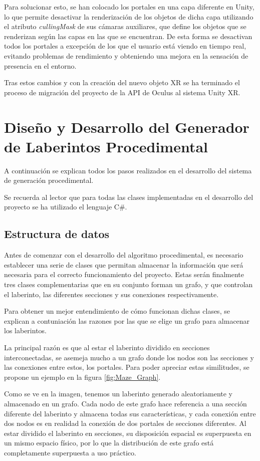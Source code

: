 \documentclass[../main.tex]{subfiles}
\begin{document}
Para solucionar esto, se han colocado los portales en una capa diferente en Unity, lo que permite desactivar la renderización de los objetos de dicha capa utilizando el atributo \textit{cullingMask} de sus cámaras auxiliares, que define los objetos que se renderizan según las capas en las que se encuentran. De esta forma se desactivan todos los portales a excepción de los que el usuario está viendo en tiempo real, evitando problemas de rendimiento y obteniendo una mejora en la sensación de presencia en el entorno.

Tras estos cambios y con la creación del nuevo objeto XR se ha terminado el proceso de migración del proyecto de la API de Oculus al sistema Unity XR.

\section{Diseño y Desarrollo del Generador de Laberintos Procedimental}

A continuación se explican todos los pasos realizados en el desarrollo del sistema de generación procedimental.

Se recuerda al lector que para todas las clases implementadas en el desarrollo del proyecto se ha utilizado el lenguaje C\#.

\subsection{Estructura de datos}

Antes de comenzar con el desarrollo del algoritmo procedimental, es necesario establecer una serie de clases que permitan almacenar la información que será necesaria para el correcto funcionamiento del proyecto. Estas serán finalmente tres clases complementarias que en su conjunto forman un grafo, y que controlan el laberinto, las diferentes secciones y sus conexiones respectivamente.

Para obtener un mejor entendimiento de cómo funcionan dichas clases, se explican a contuniación las razones por las que se elige un grafo para almacenar los laberintos.

La principal razón es que al estar el laberinto dividido en secciones interconectadas, se asemeja mucho a un grafo donde los nodos son las secciones y las conexiones entre estos, los portales. Para poder apreciar estas similitudes, se propone un ejemplo en la figura \ref{fig:Maze_Graph}.

Como se ve en la imagen, tenemos un laberinto generado aleatoriamente y almacenado en un grafo. Cada nodo de este grafo hace referencia a una sección diferente del laberinto y almacena todas sus características, y cada conexión entre dos nodos es en realidad la conexión de dos portales de secciones diferentes. Al estar dividido el laberinto en secciones, su disposición espacial es superpuesta en un mismo espacio físico, por lo que la distribución de este grafo está completamente superpuesta a uso práctico.
\end{document}
